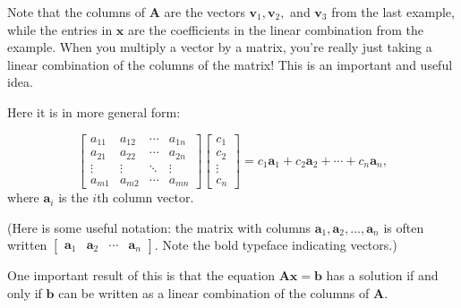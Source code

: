 \documentclass[
]{book}
\theoremstyle{definition}
\theoremstyle{definition}
\theoremstyle{definition}
\theoremstyle{definition}
\theoremstyle{remark}
\begin{document}
Note that the columns of \(\mathbf{A}\) are the vectors \(\mathbf{v}_1,\mathbf{v}_2,\) and \(\mathbf{v}_3\) from the last example, while the entries in \(\mathbf{x}\) are the coefficients in the linear combination from the example. When you multiply a vector by a matrix, you're really just taking a linear combination of the columns of the matrix! This is an important and useful idea.

Here it is in more general form:

\[\begin{bmatrix}a_{11} & a_{12} &\cdots & a_{1n}\\
a_{21} & a_{22} & \cdots & a_{2n}\\
\vdots & \vdots & \ddots & \vdots \\
a_{m1} & a_{m2} & \cdots & a_{mn}\end{bmatrix}
\begin{bmatrix} c_1\\c_2\\ \vdots\\c_n\end{bmatrix}=
c_1\mathbf{a}_1+c_2\mathbf{a}_2+\cdots+c_n\mathbf{a}_n,\]
where \(\mathbf{a}_i\) is the \(i\)th column vector.

(Here is some useful notation: the matrix with columns \(\mathbf{a}_1,\mathbf{a}_2,\dots,\mathbf{a}_n\) is often written \(\begin{bmatrix}\mathbf{a}_1&\mathbf{a}_2&\cdots&\mathbf{a}_n\end{bmatrix}\). Note the bold typeface indicating vectors.)

One important result of this is that the equation \(\mathbf{A}\mathbf{x}=\mathbf{b}\) has a solution if and only if \(\mathbf{b}\) can be written as a linear combination of the columns of \(\mathbf{A}\).
\end{document}
